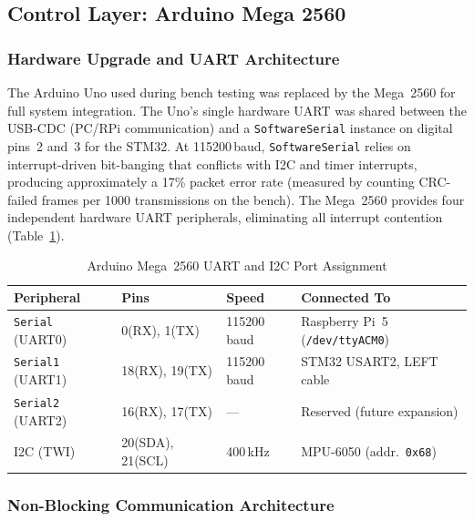 \documentclass[12pt,a4paper]{report}
\begin{document}
\subsection{Control Layer: Arduino Mega 2560}
\label{sec:control_layer_impl}

\subsubsection{Hardware Upgrade and UART Architecture}
\label{subsec:uart_arch_impl}

The Arduino Uno used during bench testing was replaced by the Mega~2560
for full system integration. The Uno's single hardware UART was shared between
the USB-CDC (PC/RPi communication) and a \texttt{SoftwareSerial} instance on
digital pins~2 and~3 for the STM32. At 115200\,baud, \texttt{SoftwareSerial}
relies on interrupt-driven bit-banging that conflicts with I2C and timer
interrupts, producing approximately a 17\% packet error rate (measured by
counting CRC-failed frames per 1000 transmissions on the bench). The Mega~2560
provides four independent hardware UART peripherals, eliminating all
interrupt contention (Table~\ref{tab:uart_assign_impl}).

\begin{table}[H]
\centering
\caption{Arduino Mega~2560 UART and I2C Port Assignment}
\label{tab:uart_assign_impl}
\begin{tabular}{@{}p{3.2cm} p{2.4cm} p{2.0cm} p{5.0cm}@{}}
\toprule
\rowcolor{rafblue!20}
\textbf{Peripheral} & \textbf{Pins} & \textbf{Speed} & \textbf{Connected To} \\
\midrule
\texttt{Serial}  (UART0) & 0(RX), 1(TX)   & 115200\,baud
  & Raspberry Pi~5 (\texttt{/dev/ttyACM0}) \\
\texttt{Serial1} (UART1) & 18(RX), 19(TX) & 115200\,baud
  & STM32 USART2, LEFT cable \\
\texttt{Serial2} (UART2) & 16(RX), 17(TX) & —
  & Reserved (future expansion) \\
I2C (TWI)                & 20(SDA), 21(SCL) & 400\,kHz
  & MPU-6050 (addr.\ \texttt{0x68}) \\
\bottomrule
\end{tabular}
\end{table}

\subsubsection{Non-Blocking Communication Architecture}
\label{subsec:nonblocking_impl}
\end{document}
